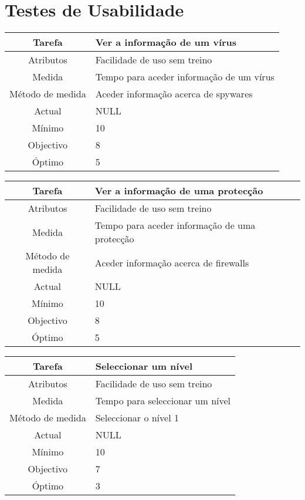 \chapter{Testes de Usabilidade}
\label{chap:tests} 

\begin{center}
	\begin{tabular} {|c|p{10cm}|}
		\hline
		Tarefa & Ver a informação de um vírus \\
		\hline
		Atributos & Facilidade de uso sem treino \\
		\hline
		Medida & Tempo para aceder informação de um vírus \\
		\hline
		Método de medida & Aceder informação acerca de spywares \\
		\hline
		Actual & NULL \\
		Mínimo & 10 \\
		Objectivo & 8 \\
		Óptimo & 5 \\
		\hline
	\end{tabular}
\end{center}

\begin{center}
	\begin{tabular} {|c|p{10cm}|}
		\hline
		Tarefa & Ver a informação de uma protecção \\
		\hline
		Atributos & Facilidade de uso sem treino \\
		\hline
		Medida & Tempo para aceder informação de uma protecção \\
		\hline
		Método de medida & Aceder informação acerca de firewalls \\
		\hline
		Actual & NULL \\
		Mínimo & 10 \\
		Objectivo & 8 \\
		Óptimo & 5 \\
		\hline
	\end{tabular}
\end{center}

\begin{center}
	\begin{tabular} {|c|p{10cm}|}
		\hline
		Tarefa & Seleccionar um nível \\
		\hline
		Atributos & Facilidade de uso sem treino \\
		\hline
		Medida & Tempo para seleccionar um nível \\
		\hline
		Método de medida & Seleccionar o nível 1 \\
		\hline
		Actual & NULL \\
		Mínimo & 10 \\
		Objectivo & 7 \\
		Óptimo & 3 \\
		\hline
	\end{tabular}
\end{center}

